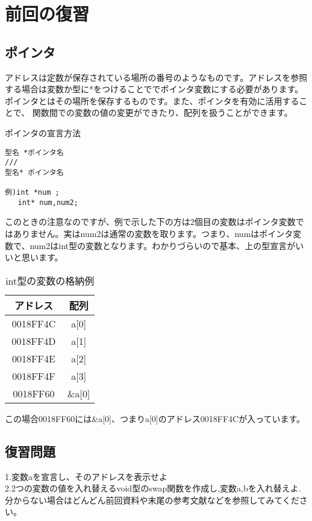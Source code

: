 ﻿\section{前回の復習}
\subsection{ポインタ}
アドレスは定数が保存されている場所の番号のようなものです。アドレスを参照する場合は変数か型に*をつけることででポインタ変数にする必要があります。
ポインタとはその場所を保存するものです。また、ポインタを有効に活用することで、
関数間での変数の値の変更ができたり、配列を扱うことができます。

\begin{itembox}{ポインタの宣言方法}
\begin{verbatim}
型名 *ポインタ名
///
型名* ポインタ名

例)int *num ;
   int* num,num2;
\end{verbatim}
\end{itembox}
このときの注意なのですが、例で示した下の方は2個目の変数はポインタ変数ではありません。実はnum2は通常の変数を取ります。つまり、numはポインタ変数で、num2はint型の変数となります。わかりづらいので基本、上の型宣言がいいと思います。
\begin{table}[htb]
\begin{center}
\begin{tabular}{|c|c|}
\hline
アドレス　& 配列\\ \hline
0018FF4C & a[0]\\ \hline
0018FF4D & a[1]\\ \hline
0018FF4E & a[2]\\ \hline
0018FF4F & a[3]\\ \hline\hline\hline
0018FF60 & \&a[0]\\
\hline

\end{tabular}
\caption{ int型の変数の格納例}
\end{center}
\end{table}
この場合0018FF60には\&a[0]、つまりa[0]のアドレス0018FF4Cが入っています。
\subsection{復習問題}
\noindent
1.変数aを宣言し、そのアドレスを表示せよ\\
2.2つの変数の値を入れ替えるvoid型のswap関数を作成し,変数a,bを入れ替えよ.\\
分からない場合はどんどん前回資料や末尾の参考文献などを参照してみてください。


